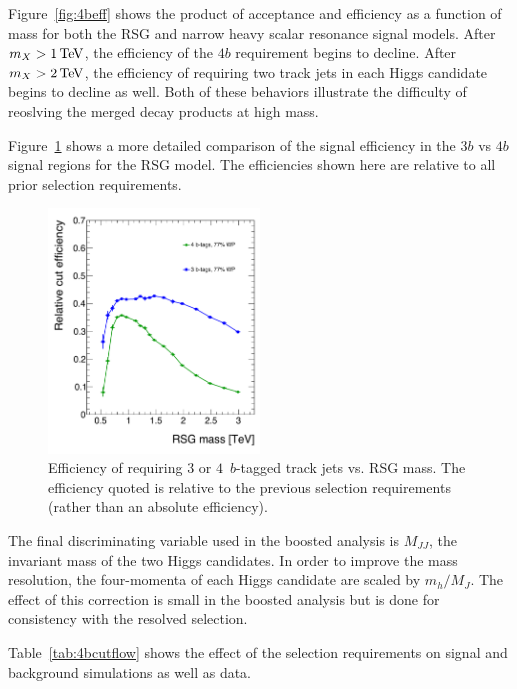 Figure~\ref{fig:4beff} shows the product of acceptance and efficiency as a function of mass for both the RSG and narrow heavy scalar resonance signal models. After $m_{X} > 1 \TeV$, the efficiency of the $4b$ requirement begins to decline. After $m_{X} > 2 \TeV$, the efficiency of requiring two track jets in each Higgs candidate begins to decline as well. Both of these behaviors illustrate the difficulty of reoslving the merged decay products at high mass.

Figure~\ref{fig:3bvs4b} shows a more detailed comparison of the signal efficiency in the $3b$ vs $4b$ signal regions for the RSG model. The efficiencies shown here are relative to all prior selection requirements. 

\begin{figure}[h!]
  \centering
  \captionsetup{justification=centering}

  \includegraphics[width=0.5\textwidth]{figures/3bvs4b_eff}
  \caption{Efficiency of requiring $3$ or $4\,$ $b$-tagged track jets vs. RSG mass. The efficiency quoted is relative to the previous selection requirements (rather than an absolute efficiency). }
  \label{fig:3bvs4b}
\end{figure}

The final discriminating variable used in the boosted analysis is $M_{JJ}$, the invariant mass of the two Higgs candidates. In order to improve the mass resolution, the four-momenta of each Higgs candidate are scaled by $m_{h}/M_{J}$. The effect of this correction is small in the boosted analysis but is done for consistency with the resolved selection. 

Table~\ref{tab:4bcutflow} shows the effect of the selection requirements on signal and background simulations as well as data. 


